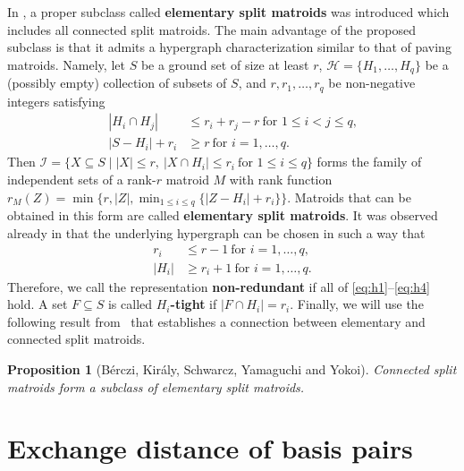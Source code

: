 \documentclass[11pt,a4paper]{article}
\theoremstyle{plain}
\newtheorem{prop}[thm]{Proposition}
\theoremstyle{definition}
\newcommand{\cI}{\mathcal{I}}
\newcommand{\cH}{\mathcal{H}}
\begin{document}
In \cite{berczi2022hypergraph}, a proper subclass called \textbf{elementary split matroids} was introduced which includes all connected split matroids. The main advantage of the proposed subclass is that it admits a hypergraph characterization similar to that of paving matroids. Namely, let $S$ be a ground set of size at least $r$, $\cH=\{H_1,\dots, H_q\}$ be a (possibly empty) collection of subsets of $S$, and $r, r_1, \dots, r_q$ be non-negative integers satisfying
\begin{align}
|H_i \cap H_j| &\le r_i + r_j -r\ \text{for $1 \le i < j \le q$,}\tag*{(H1)}\label{eq:h1}\\
|S-H_i| + r_i &\ge r\ \text{for $i=1,\dots, q$.} \tag*{(H2)}\label{eq:h2}
\end{align}
Then $\cI=\{X\subseteq S\mid |X|\leq r,\ |X\cap H_i|\leq r_i\ \text{for $1\leq i \leq q$}\}$ forms the family of independent sets of a rank-$r$ matroid $M$ with rank function $r_M(Z)=\min\big\{r,|Z|,\min_{1\leq i\leq q}\{|Z-H_i|+r_i\}\big\}$. Matroids that can be obtained in this form are called \textbf{elementary split matroids}. It was observed already in \cite{berczi2022hypergraph} that the underlying hypergraph can be chosen in such a way that 
\begin{align}
r_i &\le r-1\  \text{for $i=1,\dots, q$,} \tag*{(H3)}\label{eq:h3}\\
|H_i| &\ge r_i+1\  \text{for $i=1,\dots, q$.} \tag*{(H4)}\label{eq:h4}
\end{align}
Therefore, we call the representation \textbf{non-redundant} if all of \ref{eq:h1}--\ref{eq:h4} hold. A set $F\subseteq S$ is called \textbf{$H_i$-tight} if $|F\cap H_i|=r_i$.
Finally, we will use the following result from~\cite[Theorem 11]{berczi2022hypergraph} that establishes a connection between elementary and connected split matroids.

\begin{prop}[B\'erczi, Kir\'aly, Schwarcz, Yamaguchi and Yokoi]\label{prop:esplit}
Connected split matroids form a subclass of elementary split matroids.
\end{prop}

\section{Exchange distance of basis pairs}
\label{sec:main}
\end{document}
